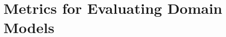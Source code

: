 \documentclass[letterpaper]{article} %
\newcommand{\realm}{{\ensuremath{M^*}}\xspace}
\newif\ifaddcomments
\newcommand{\roni}[1]{\ifaddcomments{\textcolor{red}{[Roni: #1]}}\fi}
\newcommand{\gregor}[1]{\ifaddcomments{\textcolor{orange}{[Gregor: #1]}}\fi}
\begin{document}
\section{Metrics for Evaluating Domain Models}
\label{sec:metrics}
\end{document}
